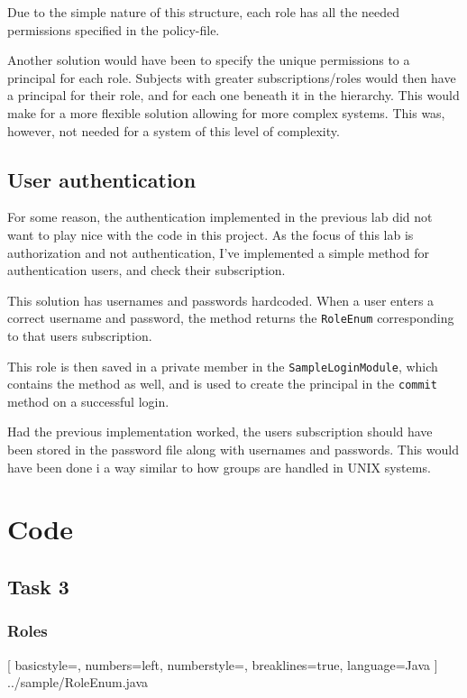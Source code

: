 \documentclass{article}
\begin{document}
Due to the simple nature of this structure,
each role has all the needed permissions
specified in the policy-file.

Another solution would have been to specify
the unique permissions to a principal for each
role. Subjects with greater subscriptions/roles
would then have a principal for their role, and
for each one beneath it in the hierarchy.
This would make for a more flexible solution
allowing for more complex systems.
This was, however, not needed for a system of
this level of complexity.

\subsection{User authentication}
For some reason, the authentication implemented
in the previous lab did not want to play nice
with the code in this project.
As the focus of this lab is authorization
and not authentication, I've implemented a simple
method for authentication users, and check
their subscription.

This solution has usernames and passwords
hardcoded. When a user enters a correct username
and password, the method returns the
\texttt{RoleEnum} corresponding to that
users subscription.

This role is then saved in a private member in
the \texttt{SampleLoginModule}, which contains
the method as well, and is used to create the
principal in the \texttt{commit} method on
a successful login.

Had the previous implementation worked,
the users subscription should have been
stored in the password file along with
usernames and passwords.
This would have been done i a way similar
to how groups are handled in UNIX systems.


\newpage
\appendix

\section{Code}

\subsection{Task 3}

\subsubsection{Roles}

[
	basicstyle=\footnotesize,
	numbers=left,
	numberstyle=\tiny,
	breaklines=true,
	language=Java
]
{../sample/RoleEnum.java}
\end{document}

